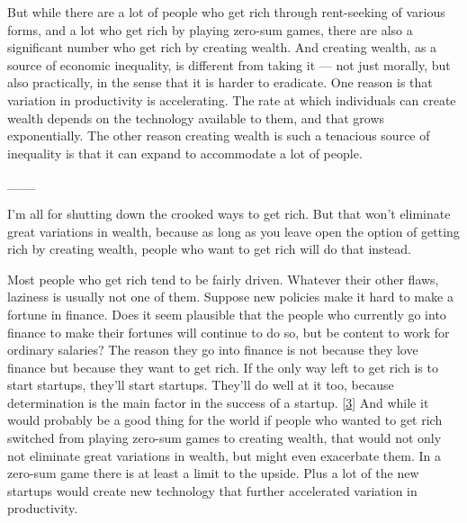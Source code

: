But while there are a lot of
                  people who get rich through rent-seeking of various forms, and
                  a lot who get rich by playing zero-sum games, there are also a
                  significant number who get rich by creating wealth. And
                  creating wealth, as a source of economic inequality, is
                  different from taking it --- not just morally, but also
                  practically, in the sense that it is harder to eradicate. One
                  reason is that variation in productivity is accelerating. The
                  rate at which individuals can create wealth depends on the
                  technology available to them, and that grows exponentially.
                  The other reason creating wealth is such a tenacious source of
                  inequality is that it can expand to accommodate a lot of
                  people.


                  \_\_\_
                  

I'm all for shutting down the crooked ways to get
                  rich. But that won't eliminate great variations in wealth,
                  because as long as you leave open the option of getting rich
                  by creating wealth, people who want to get rich will do that
                  instead.

Most people who get rich tend to be fairly
                  driven. Whatever their other flaws, laziness is usually not
                  one of them. Suppose new policies make it hard to make a
                  fortune in finance. Does it seem plausible that the people who
                  currently go into finance to make their fortunes will continue
                  to do so, but be content to work for ordinary salaries? The
                  reason they go into finance is not because they love finance
                  but because they want to get rich. If the only way left to get
                  rich is to start startups, they'll start startups. They'll do
                  well at it too, because determination is the main factor in
                  the success of a startup.
                  [\href{\#f3n}{3}]
                  And while it would probably be a good thing for the world if
                  people who wanted to get rich switched from playing zero-sum
                  games to creating wealth, that would not only not eliminate
                  great variations in wealth, but might even exacerbate them. In
                  a zero-sum game there is at least a limit to the upside. Plus
                  a lot of the new startups would create new technology that
                  further accelerated variation in productivity.

